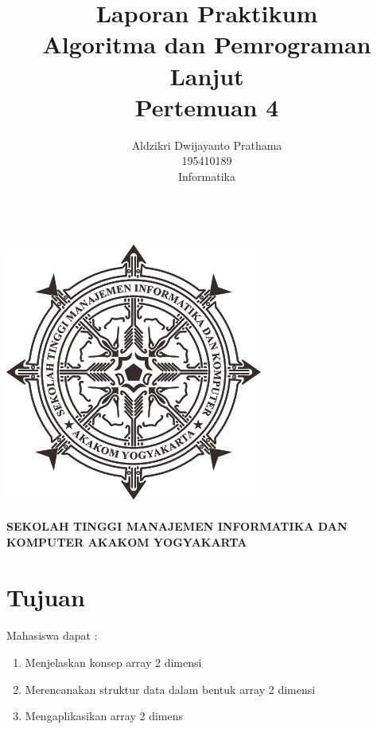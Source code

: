 \documentclass[a4paper,12pt]{article}
\begin{document}
\title{ {\Large Laporan Praktikum}\\ Algoritma dan Pemrograman Lanjut\\{\Large Pertemuan 4}}

\author{Aldzikri Dwijayanto Prathama 
	\\195410189
	\\Informatika}
\makeatletter
\begin{titlepage}
	\begin{center}
		{\huge \bfseries \@title }\\[14ex]
		\includegraphics[scale=.8]{logo}\\[4ex]
		{\large \@author}\\[12ex]
		{\large \bfseries {SEKOLAH TINGGI MANAJEMEN INFORMATIKA DAN KOMPUTER
				AKAKOM YOGYAKARTA}}
	\end{center}


\end{titlepage}
\makeatother
\newpage
\tableofcontents
\newpage

\section{Tujuan}
\paragraph{}
Mahasiswa dapat :
\begin{enumerate}
    \item Menjelaskan konsep array 2 dimensi
    \item Merencanakan struktur data dalam bentuk array 2 dimensi
    \item Mengaplikasikan array 2 dimens
\end{enumerate}
\end{document}
